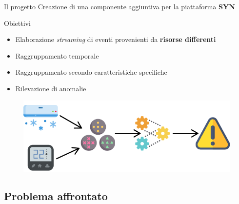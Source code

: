 \documentclass{beamer}
\begin{document}
	\begin{frame}{Il progetto}
	\vspace{.5em}
		Creazione di una componente aggiuntiva per la piattaforma \textbf{SYN} \vspace{.2em}
		
		\begin{block}{Obiettivi}
			\begin{itemize}
				\item Elaborazione \textit{streaming} di eventi provenienti da \textbf{risorse differenti} \vspace{.5em}
				\item Raggruppamento temporale \vspace{.5em}
				\item Raggruppamento secondo caratteristiche specifiche \vspace{.5em}
				\item Rilevazione di anomalie \vspace{.5em} 			
			\end{itemize}
		\end{block}
		
		\vspace{-0.3cm}
		\begin{figure}[!h] 
    		\centering 
    		\includegraphics[width=0.55\columnwidth]{../immagini/slide/elaboration_example.png}
		\end{figure}
		
	\end{frame}
	
	\subsection{Problema affrontato}
\end{document}
